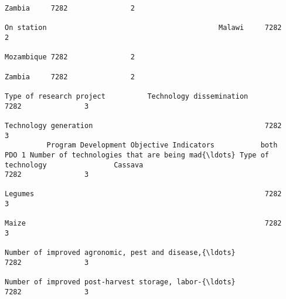 \documentclass[11pt]{article}
\begin{document}
\begin{Verbatim}[commandchars=\\\{\}]
                                                                                                                                                                                                                 Zambia     7282               2  
                                                                                                                                                              On station                                         Malawi     7282               2  
                                                                                                                                                                                                                 Mozambique 7282               2  
                                                                                                                                                                                                                 Zambia     7282               2  
                                                                                                                            Type of research project          Technology dissemination                                      7282               3  
                                                                                                                                                              Technology generation                                         7282               3  
          Program Development Objective Indicators           both        PDO 1 Number of technologies that are being mad{\ldots} Type of technology                Cassava                                                       7282               3  
                                                                                                                                                              Legumes                                                       7282               3  
                                                                                                                                                              Maize                                                         7282               3  
                                                                                                                                                              Number of improved agronomic, pest and disease,{\ldots}            7282               3  
                                                                                                                                                              Number of improved post-harvest storage, labor-{\ldots}            7282               3  

\end{Verbatim}
\end{document}
